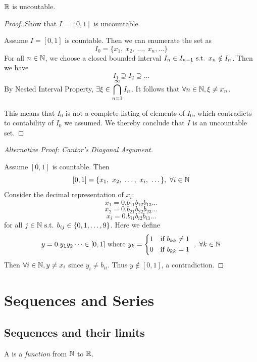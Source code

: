 \documentclass[a4paper,12pt]{article}
\begin{document}
\newpage
\begin{theorem}
    \(\mathbb{R}\) is uncoutable.
    \begin{proof}
         Show that \(I=[0,1]\) is uncountable.

        Assume \(I=[0,1]\) is countable. Then we can enumerate the set as 
        \[I_0=\{x_1,\ x_2,\ \dots,\ x_n,\dots\}\]
        For all \(n\in\mathbb{N}\), we choose a closed bounded interval \(I_{n}\in I_{n-1}\text{ s.t. } x_n\notin I_n\). Then we have 
        \[I_1\supseteq I_2\supseteq\dots\]
        By Nested Interval Property, \(\exists \xi\in\displaystyle\bigcap_{n=1}^{\infty}I_n\). It follows that \(\forall n\in\mathbb{N}, \xi\neq x_n\). 

        This means that \(I_0\) is not a complete listing of elements of \(I_0\), which contradicts to contability of \(I_0\) we assumed. 
        We thereby conclude that \(I\) is an uncountable set.
    \end{proof}
    \begin{proof}[Alternative Proof: Cantor's Diagonal Argument]\ 

        Assume \([0,1]\) is countable. Then 
        \[[0,1]=\{x_1,\ x_2,\ \dots,\ x_i,\ \dots\},\ \forall i\in\N\]
        Consider the decimal representation of \(x_i\):
        \[x_1=0.b_{11}b_{12}b_{13}...\]
        \[x_2=0.b_{21}b_{22}b_{23}...\]
        \[x_i=0.b_{i1}b_{i2}b_{i3}...\]
        for all \(j\in\mathbb{N}\text{ s.t. } b_{ij}\in\{0,1,\dots,9\}\). Here we define 
        \[y=0.y_1y_2\dots\in[0,1]\text{ where }y_k=\begin{cases*}
            1& if \(b_{kk}\neq 1\)\\
            0& if \(b_{kk}=1\)
        \end{cases*},\ \forall k\in\N\]
        Then \(\forall i\in\mathbb{N}, y\neq x_i\) since \(y_i\neq b_{ii}\). Thus \(y\notin [0,1]\), a contradiction.
    \end{proof}
\end{theorem}


\newpage
\section{Sequences and Series}
\subsection{Sequences and their limits}

\begin{definition}
    A  is a \textit{function} from $\mathbb{N}$ to $\mathbb{R}$.
\end{definition}
\end{document}
